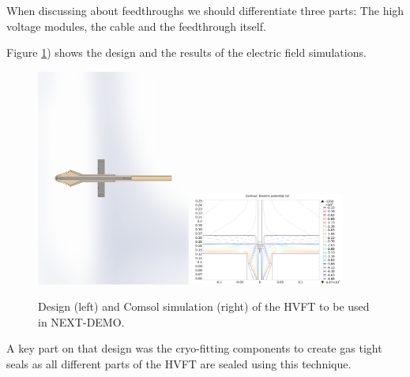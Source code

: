 When discussing about feedthroughs we should differentiate three parts: The high voltage modules, the cable and the feedthrough itself.

Figure \ref{fig:hvft1}) shows the design and the results of the electric field simulations.

\begin{figure}[h!]
\centering
\includegraphics[width=0.45\textwidth]{img/hvft1.pdf}
\includegraphics[width=0.45\textwidth]{img/HVFT_with_drift.png}
\caption{Design (left) and Comsol simulation (right) of the HVFT to be used in NEXT-DEMO.} \label{fig:hvft1}
\end{figure}

A key part on that design was the cryo-fitting components to create gas tight seals as all different parts of the HVFT are sealed using this technique.


